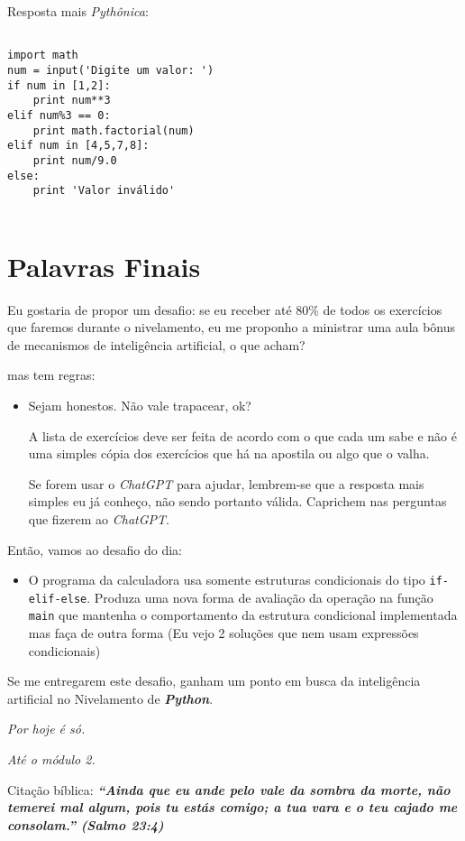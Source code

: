 \documentclass[a4paper, 12pt, onecolumn,singlespacing]{article}
\begin{document}
Resposta mais \textit{Pythônica}:

\begin{verbatim}
		
import math
num = input('Digite um valor: ')
if num in [1,2]:
	print num**3
elif num%3 == 0:
	print math.factorial(num)
elif num in [4,5,7,8]:
	print num/9.0
else:
	print 'Valor inválido'
	
\end{verbatim}

\section{Palavras Finais}

Eu gostaria de propor um desafio: se eu receber até 80\% de todos os exercícios que faremos durante o nivelamento, eu me proponho a ministrar uma aula bônus de mecanismos de inteligência artificial, o que acham?

mas tem regras:

\begin{itemize}
	\item Sejam honestos. Não vale trapacear, ok?
	
	\subitem A lista de exercícios deve ser feita de acordo com o que cada um sabe e não é uma simples cópia dos exercícios que há na apostila ou algo que o valha.
	
	\subitem Se forem usar o \textit{ChatGPT} para ajudar, lembrem-se que a resposta mais simples eu já conheço, não sendo portanto válida. Caprichem nas perguntas que fizerem ao \textit{ChatGPT}.
	
\end{itemize}

Então, vamos ao desafio do dia:

\begin{itemize}
	\item O programa da calculadora usa somente estruturas condicionais do tipo \texttt{if-elif-else}. Produza uma nova forma de avaliação da operação na função \texttt{main} que mantenha o comportamento da estrutura condicional implementada mas faça de outra forma (Eu vejo 2 soluções que nem usam expressões condicionais) 
\end{itemize}

Se me entregarem este desafio, ganham um ponto em busca da inteligência artificial no Nivelamento de \textbf{\textit{Python}}.

\textit{Por hoje é só.}

\textit{Até o módulo 2.}

Citação bíblica: \textit{\textbf{``Ainda que eu ande pelo vale da sombra da morte, não temerei mal algum, pois tu estás comigo; a tua vara e o teu cajado me consolam.'' (Salmo 23:4)}}
\end{document}
